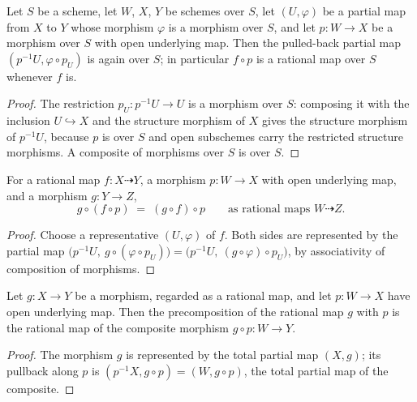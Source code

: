 \begin{lemma}
  \label{pa-lem:ratmap_precomp_over}
  \leanok

  Let \(S\) be a scheme, let \(W\), \(X\), \(Y\) be schemes over \(S\), let
  \((U, \varphi)\) be a partial map from \(X\) to \(Y\) whose morphism
  \(\varphi\) is a morphism over \(S\), and let \(p : W \to X\) be a morphism
  over \(S\) with open underlying map. Then the pulled-back partial map
  \((p^{-1}U, \varphi \circ p_U)\) is again over \(S\); in particular \(f \circ p\)
  is a rational map over \(S\) whenever \(f\) is.
\end{lemma}
\begin{proof}
  \leanok
  The restriction \(p_U : p^{-1}U \to U\) is a morphism over \(S\): composing it
  with the inclusion \(U \hookrightarrow X\) and the structure morphism of \(X\)
  gives the structure morphism of \(p^{-1}U\), because \(p\) is over \(S\) and
  open subschemes carry the restricted structure morphisms. A composite of
  morphisms over \(S\) is over \(S\).
\end{proof}

\begin{lemma}
  \label{pa-lem:ratmap_precomp_compHom}
  \leanok

  For a rational map \(f : X \dashrightarrow Y\), a morphism \(p : W \to X\) with
  open underlying map, and a morphism \(g : Y \to Z\),
  \[
    g \circ (f \circ p) \;=\; (g \circ f) \circ p
    \qquad\text{as rational maps } W \dashrightarrow Z .
  \]
\end{lemma}
\begin{proof}
  \leanok
  Choose a representative \((U, \varphi)\) of \(f\). Both sides are represented
  by the partial map \(\bigl(p^{-1}U,\ g \circ (\varphi \circ p_U)\bigr)
  = \bigl(p^{-1}U,\ (g \circ \varphi) \circ p_U\bigr)\), by associativity of
  composition of morphisms.
\end{proof}

\begin{lemma}
  \label{pa-lem:ratmap_precomp_morphism}
  \leanok

  Let \(g : X \to Y\) be a morphism, regarded as a rational map, and let
  \(p : W \to X\) have open underlying map. Then the precomposition of the
  rational map \(g\) with \(p\) is the rational map of the composite morphism
  \(g \circ p : W \to Y\).
\end{lemma}
\begin{proof}
  \leanok
  The morphism \(g\) is represented by the total partial map \((X, g)\); its
  pullback along \(p\) is \((p^{-1}X, g \circ p) = (W, g \circ p)\), the total
  partial map of the composite.
\end{proof}

